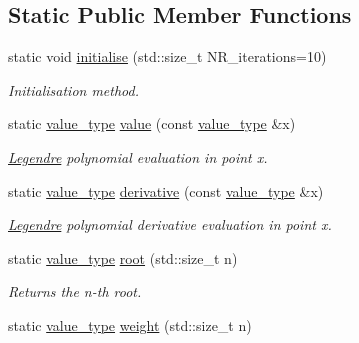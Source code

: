 \subsection*{Static Public Member Functions}
\begin{DoxyCompactItemize}
\item 
static void \hyperlink{a00319_a6e64948b240f9bf2a13a815e5e813d91}{initialise} (std\-::size\-\_\-t N\-R\-\_\-iterations=10)
\begin{DoxyCompactList}\small\item\em Initialisation method. \end{DoxyCompactList}\item 
\hypertarget{a00319_aa6108158ad3067ce30d29013f1a69d63}{static \hyperlink{a00319_a6eb9a63823f5074b09c8c916818d94e7}{value\-\_\-type} \hyperlink{a00319_aa6108158ad3067ce30d29013f1a69d63}{value} (const \hyperlink{a00319_a6eb9a63823f5074b09c8c916818d94e7}{value\-\_\-type} \&x)}\label{a00319_aa6108158ad3067ce30d29013f1a69d63}

\begin{DoxyCompactList}\small\item\em \hyperlink{a00319}{Legendre} polynomial evaluation in point x. \end{DoxyCompactList}\item 
\hypertarget{a00319_af34d5658c1c955157d2a82f2ff3a9d00}{static \hyperlink{a00319_a6eb9a63823f5074b09c8c916818d94e7}{value\-\_\-type} \hyperlink{a00319_af34d5658c1c955157d2a82f2ff3a9d00}{derivative} (const \hyperlink{a00319_a6eb9a63823f5074b09c8c916818d94e7}{value\-\_\-type} \&x)}\label{a00319_af34d5658c1c955157d2a82f2ff3a9d00}

\begin{DoxyCompactList}\small\item\em \hyperlink{a00319}{Legendre} polynomial derivative evaluation in point x. \end{DoxyCompactList}\item 
\hypertarget{a00319_a15d6ba871e96f4b44f9063d5240b8e7c}{static \hyperlink{a00319_a6eb9a63823f5074b09c8c916818d94e7}{value\-\_\-type} \hyperlink{a00319_a15d6ba871e96f4b44f9063d5240b8e7c}{root} (std\-::size\-\_\-t n)}\label{a00319_a15d6ba871e96f4b44f9063d5240b8e7c}

\begin{DoxyCompactList}\small\item\em Returns the n-\/th root. \end{DoxyCompactList}\item 
\hypertarget{a00319_ae15e195f92889818dcd965c0b98648d7}{static \hyperlink{a00319_a6eb9a63823f5074b09c8c916818d94e7}{value\-\_\-type} \hyperlink{a00319_ae15e195f92889818dcd965c0b98648d7}{weight} (std\-::size\-\_\-t n)}\label{a00319_ae15e195f92889818dcd965c0b98648d7}


\end{DoxyCompactItemize}
